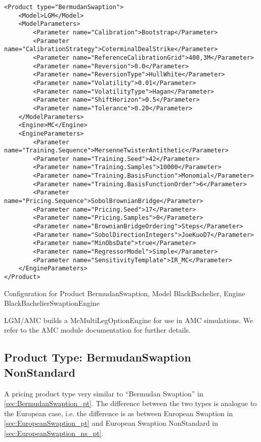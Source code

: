 \begin{longlisting}
\begin{verbatim}
<Product type="BermudanSwaption">
    <Model>LGM</Model>
    <ModelParameters>
        <Parameter name="Calibration">Bootstrap</Parameter>
        <Parameter name="CalibrationStrategy">CoterminalDealStrike</Parameter>
        <Parameter name="ReferenceCalibrationGrid">400,3M</Parameter>
        <Parameter name="Reversion">0.0</Parameter>
        <Parameter name="ReversionType">HullWhite</Parameter>
        <Parameter name="Volatility">0.01</Parameter>
        <Parameter name="VolatilityType">Hagan</Parameter>
        <Parameter name="ShiftHorizon">0.5</Parameter>
        <Parameter name="Tolerance">0.20</Parameter>
    </ModelParameters>
    <Engine>MC</Engine>
    <EngineParameters>
        <Parameter name="Training.Sequence">MersenneTwisterAntithetic</Parameter>
        <Parameter name="Training.Seed">42</Parameter>
        <Parameter name="Training.Samples">10000</Parameter>
        <Parameter name="Training.BasisFunction">Monomial</Parameter>
        <Parameter name="Training.BasisFunctionOrder">6</Parameter>
        <Parameter name="Pricing.Sequence">SobolBrownianBridge</Parameter>
        <Parameter name="Pricing.Seed">17</Parameter>
        <Parameter name="Pricing.Samples">0</Parameter>
        <Parameter name="BrownianBridgeOrdering">Steps</Parameter>
        <Parameter name="SobolDirectionIntegers">JoeKuoD7</Parameter>
        <Parameter name="MinObsDate">true</Parameter>
        <Parameter name="RegressorModel">Simple</Parameter>
        <Parameter name="SensitivityTemplate">IR_MC</Parameter>
    </EngineParameters>
</Product>
\end{verbatim}
\caption{Configuration for Product BermudanSwaption, Model BlackBachelier, Engine BlackBachelierSwaptionEngine}
\label{lst:peconfig_BermudanSwaption_LGM_MC}
\end{longlisting}

LGM/AMC builds a McMultiLegOptionEngine for use in AMC simulations. We refer to the AMC module documentation for further
details.

\subsection{Product Type: BermudanSwaption NonStandard}

A pricing product type very similar to ``Bermudan Swaption'' in \ref{sec:BermudanSwaption_pt}. 
The difference between the two types is analogue to the European case, i.e. the difference is 
as between European Swaption in \ref{sec:EuropeanSwaption_pt} and European Swaption NonStandard in \ref{sec:EuropeanSwaption_ns_pt}.

